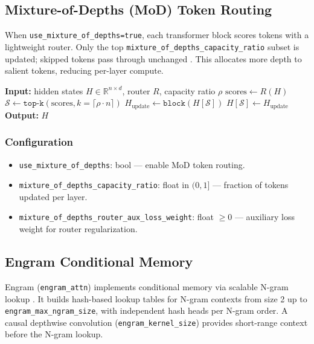 \subsection{Mixture-of-Depths (MoD) Token Routing}

When \texttt{use\_mixture\_of\_depths=true}, each transformer block scores tokens with a lightweight router. Only the top \texttt{mixture\_of\_depths\_capacity\_ratio} subset is updated; skipped tokens pass through unchanged \citep{zhu2026mixtureofdepthsattention}. This allocates more depth to salient tokens, reducing per-layer compute.

\begin{algorithmic}[1]
\State \textbf{Input:} hidden states $H \in \mathbb{R}^{n \times d}$, router $R$, capacity ratio $\rho$
\State $\text{scores} \gets R(H)$ 
\State $\mathcal{S} \gets \texttt{top-k}(\text{scores}, k=\lceil \rho \cdot n \rceil)$ 
\State $H_{\text{update}} \gets \texttt{block}(H[\mathcal{S}])$ 
\State $H[\mathcal{S}] \gets H_{\text{update}}$ 
\State \textbf{Output:} $H$ 
\end{algorithmic}

\subsubsection{Configuration}
\begin{itemize}[leftmargin=*]
    \item \texttt{use\_mixture\_of\_depths}: bool --- enable MoD token routing.
    \item \texttt{mixture\_of\_depths\_capacity\_ratio}: float in $(0, 1]$ --- fraction of tokens updated per layer.
    \item \texttt{mixture\_of\_depths\_router\_aux\_loss\_weight}: float $\ge 0$ --- auxiliary loss weight for router regularization.
\end{itemize}

\subsection{Engram Conditional Memory}

Engram (\texttt{engram\_attn}) implements conditional memory via scalable N-gram lookup \citep{cheng2026conditionalmemoryscalablelookup}. It builds hash-based lookup tables for N-gram contexts from size 2 up to \texttt{engram\_max\_ngram\_size}, with independent hash heads per N-gram order. A causal depthwise convolution (\texttt{engram\_kernel\_size}) provides short-range context before the N-gram lookup.

